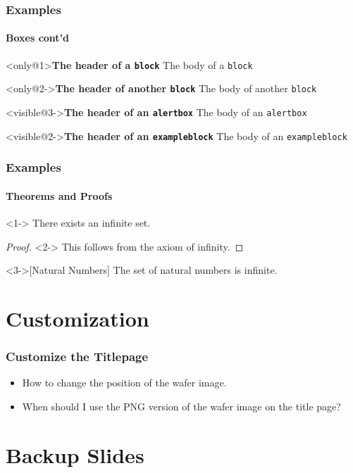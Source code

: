 \documentclass{beamer}
\begin{document}
\begin{frame}
  \frametitle{Examples}
  \framesubtitle{Boxes cont'd}
  \vfill
  \begin{block}<only@1>{\textbf{The header of a \texttt{block}}}
    The body of a \texttt{block}
  \end{block}
    \begin{block}<only@2->{\textbf{The header of another \texttt{block}}}
    The body of another \texttt{block}
  \end{block}
  \vfill
  \begin{alertblock}<visible@3->{\textbf{The header of an \texttt{alertbox}}}
    The body of an \texttt{alertbox}
  \end{alertblock}
  \vfill
  \begin{exampleblock}<visible@2->{\textbf{The header of an \texttt{exampleblock}}}
    The body of an \texttt{exampleblock}
  \end{exampleblock}
  \vfill
\end{frame}


\begin{frame}
  \frametitle{Examples}
  \framesubtitle{Theorems and Proofs}
  \vfill
  \begin{theorem}<1->
    There exists an infinite set.
  \end{theorem}
  \vfill
  \begin{proof}<2->
    This follows from the axiom of infinity.
  \end{proof}
  \vfill
  \begin{example}<3->[Natural Numbers]
    The set of natural numbers is infinite.
  \end{example}
  \vfill
\end{frame}


\section{Customization}

\begin{frame}
  \frametitle{Customize the Titlepage}
  \begin{itemize}
  \item How to change the position of the wafer image.
  \item When should I use the PNG version of the wafer image on the
    title page?
  \end{itemize}
\end{frame}


\section{Backup Slides}
\end{document}
